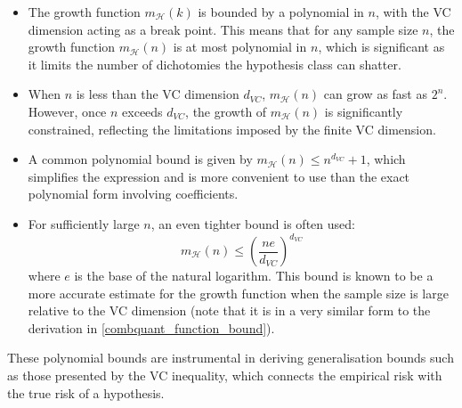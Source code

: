 \begin{itemize}
  \item The growth function \(m_{\mathcal{H}}(k)\) is bounded by a polynomial in \(n\), with the VC dimension acting as a break point. This means that for any sample size \(n\), the growth function \(m_{\mathcal{H}}(n)\) is at most polynomial in \(n\), which is significant as it limits the number of dichotomies the hypothesis class can shatter.
  
  \item When \(n\) is less than the VC dimension \(d_{VC}\), \(m_{\mathcal{H}}(n)\) can grow as fast as \(2^n\). However, once \(n\) exceeds \(d_{VC}\), the growth of \(m_{\mathcal{H}}(n)\) is significantly constrained, reflecting the limitations imposed by the finite VC dimension.
  
  \item A common polynomial bound is given by \(m_{\mathcal{H}}(n) \leq n^{d_{VC}} + 1\), which simplifies the expression and is more convenient to use than the exact polynomial form involving coefficients.
  
  \item For sufficiently large \(n\), an even tighter bound is often used:
  \[
  m_{\mathcal{H}}(n) \leq \left(\frac{ne}{d_{VC}}\right)^{d_{VC}}
  \] 
  where \(e\) is the base of the natural logarithm. This bound is known to be a more accurate estimate for the growth function when the sample size is large relative to the VC dimension (note that it is in a very similar form to the derivation in \ref{combquant_function_bound}).
\end{itemize}

These polynomial bounds are instrumental in deriving generalisation bounds such as those presented by the VC inequality, which connects the empirical risk with the true risk of a hypothesis.

